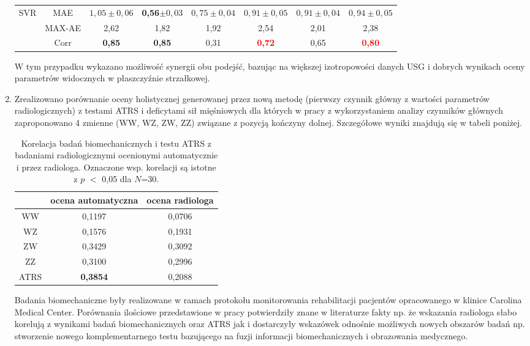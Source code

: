\begin{enumerate}
\begin{table}[h!]
\begin{tabular}{lc||c|c|c|c|c|c}
 		SVR & MAE & $1,05\pm0,06$ & \textbf{0,56}$\pm0,03$ & $0,75\pm0,04$ & $0,91\pm0,05$ & $0,91\pm0,04$ & $0,94\pm0,05$\\
 		& MAX-AE & 2,62 & 1,82 & 1,92 & 2,54 & 2,01 & 2,38 \\
 		& Corr   & \textbf{0,85} & \textbf{0,85} & 0,31 & \textcolor{red}{\textbf{0,72}} & 0,65 & \textcolor{red}{\textbf{0,80}} \\
 		
 	\end{tabular}
 \end{table}
 \renewcommand{\arraystretch}{1}

 W tym przypadku wykazano możliwość synergii obu podejść, bazując na większej izotropowości danych USG i dobrych wynikach oceny parametrów widocznych w płaszczyźnie strzałkowej.
 \item Zrealizowano porównanie oceny holistycznej generowanej przez nową metodę (pierwszy czynnik główny z wartości parametrów radiologicznych) z testami ATRS i deficytami sił mięśniowych dla których w pracy z wykorzystaniem analizy czynników głównych zaproponowano 4 zmienne (WW, WZ, ZW, ZZ) związane z pozycją kończyny dolnej. Szczegółowe wyniki znajdują się w tabeli poniżej. 
 \vspace{0.5 cm} 
 \begin{table}[h!]
 	\centering
 	\setlength{\tabcolsep}{3pt}
 	\setlength\extrarowheight{2pt}
 	\caption{Korelacja badań biomechanicznych i testu ATRS z badaniami radiologicznymi ocenionymi automatycznie i przez radiologa. Oznaczone wsp. korelacji są istotne z $p$ $<$ 0,05 dla $N$=30.}
 	\label{tab:bioATRSvspredGT}
 	\begin{tabular}{c|c|c}
 		&ocena automatyczna&ocena radiologa \\
 		\hline \hline
 		WW&0,1197&0,0706\\
 		\hline
 		WZ&0,1576&0,1931\\
 		\hline
 		ZW&0,3429&0,3092\\
 		\hline
 		ZZ&0,3100&0,2996\\
 		\hline
 		ATRS&\textbf{0,3854}&0,2088\\
 		
 		
 	\end{tabular}
 \end{table}
	
	Badania biomechaniczne były realizowane w ramach protokołu monitorowania rehabilitacji pacjentów opracowanego w klinice Carolina Medical Center. Porównania ilościowe przedstawione w pracy potwierdziły znane w literaturze fakty np. że wskazania radiologa słabo korelują z wynikami badań biomechanicznych oraz ATRS jak i dostarczyły wskazówek odnośnie możliwych nowych obszarów badań np. stworzenie nowego komplementarnego testu bazującego na fuzji informacji biomechanicznych i obrazowania medycznego. 

\end{enumerate}

